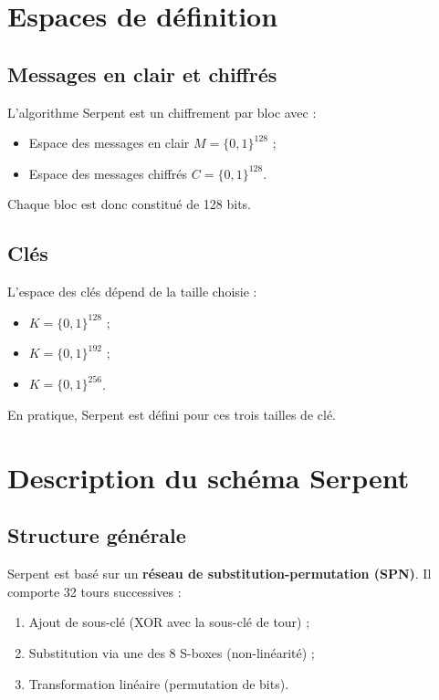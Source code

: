 \documentclass[12pt,a4paper]{report}
\begin{document}
\tableofcontents

\section*{Espaces de définition}

\subsection{Messages en clair et chiffrés}
L’algorithme Serpent est un chiffrement par bloc avec :
\begin{itemize}
    \item Espace des messages en clair $M = \{0,1\}^{128}$ ;
    \item Espace des messages chiffrés $C = \{0,1\}^{128}$.
\end{itemize}
Chaque bloc est donc constitué de 128 bits.

\subsection{Clés}
L’espace des clés dépend de la taille choisie :
\begin{itemize}
    \item $K = \{0,1\}^{128}$ ;
    \item $K = \{0,1\}^{192}$ ;
    \item $K = \{0,1\}^{256}$.
\end{itemize}
En pratique, Serpent est défini pour ces trois tailles de clé.

\section*{Description du schéma Serpent}

\setcounter{subsection}{0}

\subsection{Structure générale}
Serpent est basé sur un \textbf{réseau de substitution-permutation (SPN)}.  
Il comporte 32 tours successives :
\begin{enumerate}
    \item Ajout de sous-clé (XOR avec la sous-clé de tour) ;
    \item Substitution via une des 8 S-boxes (non-linéarité) ;
    \item Transformation linéaire (permutation de bits).
\end{enumerate}
\end{document}
